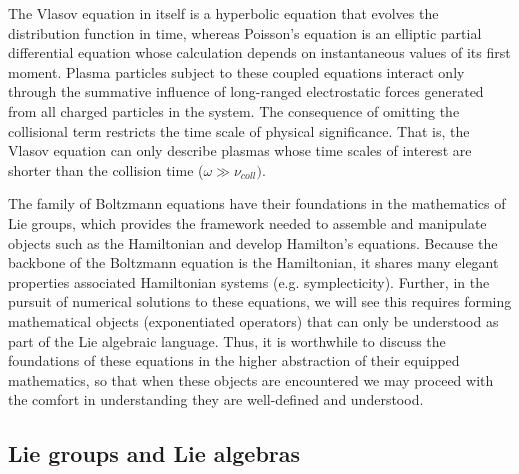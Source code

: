 \documentclass[11pt,titlepage]{report}
\begin{document}
\noindent The Vlasov equation in itself is a hyperbolic equation that evolves the distribution function in time, whereas Poisson's equation is an elliptic partial differential equation whose calculation depends on instantaneous values of its first moment. Plasma particles subject to these coupled equations interact only through the summative influence of long-ranged electrostatic forces generated from all charged particles in the system. The consequence of omitting the collisional term restricts the time scale of physical significance. That is, the Vlasov equation can only describe plasmas whose time scales of interest are shorter than the collision time ($\omega \gg \nu_{coll})$. 

The family of Boltzmann equations have their foundations in the mathematics of Lie groups, which provides the framework needed to assemble and manipulate objects such as the Hamiltonian and develop Hamilton's equations. Because the backbone of the Boltzmann equation is the Hamiltonian, it shares many elegant properties associated Hamiltonian systems (e.g. symplecticity). Further, in the pursuit of numerical solutions to these equations, we will see this requires forming mathematical objects (exponentiated operators) that can only be understood as part of the Lie algebraic language. Thus, it is worthwhile to discuss the foundations of these equations in the higher abstraction of their equipped mathematics, so that when these objects are encountered we may proceed with the comfort in understanding they are well-defined and understood.


\subsection{Lie groups and Lie algebras}
\end{document}
